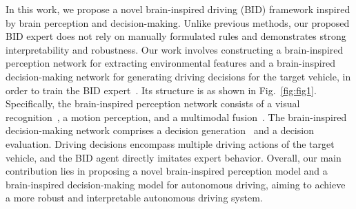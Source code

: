 In this work, we propose a novel brain-inspired driving (BID) framework inspired by brain perception and decision-making. 
Unlike previous methods, our proposed BID expert does not rely on manually formulated rules and demonstrates strong interpretability and robustness.
Our work involves constructing a brain-inspired perception network for extracting environmental features and a brain-inspired decision-making network for generating driving decisions for the target vehicle, in order to train the BID expert~\cite{kahn2021land}. 
Its structure is as shown in Fig.~\ref{fig:fig1}. 
Specifically, the brain-inspired perception network consists of a visual recognition~\cite{8574054}, a motion perception, and a multimodal fusion~\cite{liao2021statistical}. 
The brain-inspired decision-making network comprises a decision generation~\cite{dai2013dynamic} and a decision evaluation. 
Driving decisions encompass multiple driving actions of the target vehicle, and the BID agent directly imitates expert behavior. 
Overall, our main contribution lies in proposing a novel brain-inspired perception model and a brain-inspired decision-making model for autonomous driving, aiming to achieve a more robust and interpretable autonomous driving system.





